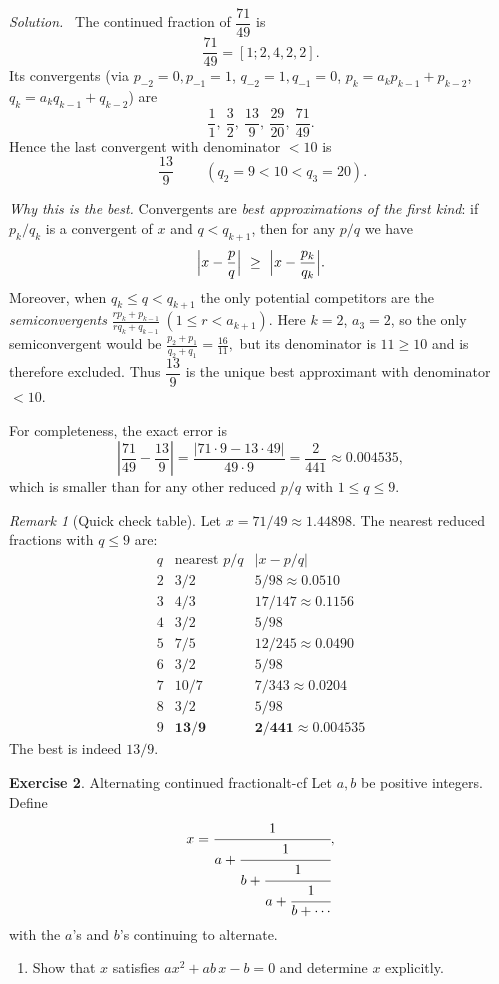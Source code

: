\documentclass[11pt,a4paper]{article}
\theoremstyle{definition}
\newtheorem{exercise}{Exercise} %
\theoremstyle{definition}
\theoremstyle{plain}
\theoremstyle{remark}
\newtheorem{remark}[exercise]{Remark}
\newenvironment{solution}{\par\noindent\textit{Solution.}\ }{\par\vspace{0.5em}}
\begin{document}
\begin{solution}
	The continued fraction of $\dfrac{71}{49}$ is
	\[
	\frac{71}{49}=[1;2,4,2,2].
	\]
	Its convergents (via $p_{-2}=0,p_{-1}=1$, $q_{-2}=1,q_{-1}=0$, $p_k=a_kp_{k-1}+p_{k-2}$,
	$q_k=a_kq_{k-1}+q_{k-2}$) are
	\[
	\frac{1}{1},\ \frac{3}{2},\ \frac{13}{9},\ \frac{29}{20},\ \frac{71}{49}.
	\]
	Hence the last convergent with denominator $<10$ is
	\[
	\boxed{\ \frac{13}{9}\ } \qquad(q_2=9<10<q_3=20).
	\]
	
	\emph{Why this is the best.}  Convergents are \emph{best approximations of the first kind}:  
	if $p_k/q_k$ is a convergent of $x$ and $q<q_{k+1}$, then for any $p/q$ we have
	\[
	\Bigl|x-\frac{p}{q}\Bigr|\ \ge\ \Bigl|x-\frac{p_k}{q_k}\Bigr|.
	\]
	Moreover, when $q_k\le q<q_{k+1}$ the only potential competitors are the
	\emph{semiconvergents}
	\(
	\frac{r p_k+p_{k-1}}{r q_k+q_{k-1}}\ (1\le r<a_{k+1}).
	\)
	Here $k=2$, $a_{3}=2$, so the only semiconvergent would be
	\(
	\frac{p_2+p_1}{q_2+q_1}=\frac{16}{11},
	\)
	but its denominator is $11\ge10$ and is therefore excluded.
	Thus $\dfrac{13}{9}$ is the unique best approximant with denominator $<10$.
	
	For completeness, the exact error is
	\[
	\left|\frac{71}{49}-\frac{13}{9}\right|
	=\frac{|71\cdot 9-13\cdot 49|}{49\cdot 9}
	=\frac{2}{441}\approx 0.004535,
	\]
	which is smaller than for any other reduced $p/q$ with $1\le q\le 9$.
\end{solution}

\begin{remark}[Quick check table]
	Let $x=71/49\approx 1.44898$.  The nearest reduced fractions with $q\le 9$ are:
	\[
	\begin{array}{c|c|c}
		q & \text{nearest }p/q & |x-p/q|\\ \hline
		2 & 3/2   & 5/98 \approx 0.0510\\
		3 & 4/3   & 17/147 \approx 0.1156\\
		4 & 3/2   & 5/98 \\
		5 & 7/5   & 12/245 \approx 0.0490\\
		6 & 3/2   & 5/98 \\
		7 & 10/7  & 7/343 \approx 0.0204\\
		8 & 3/2   & 5/98 \\
		9 & \mathbf{13/9} & \mathbf{2/441 \approx 0.004535}
	\end{array}
	\]
	The best is indeed $13/9$.
\end{remark}

\begin{exercise}{Alternating continued fraction}{alt-cf}
	Let $a,b$ be positive integers. Define
	\[
	x=\cfrac{1}{\displaystyle a+\cfrac{1}{\displaystyle b+\cfrac{1}{\displaystyle a+\cfrac{1}{\displaystyle b+\cdots}}}},
	\]
	with the $a$’s and $b$’s continuing to alternate.
	\begin{enumerate}
		\item[(a)] Show that $x$ satisfies $a x^{2}+ab\,x-b=0$ and determine $x$ explicitly.
	\end{enumerate}
\end{exercise}
\end{document}
